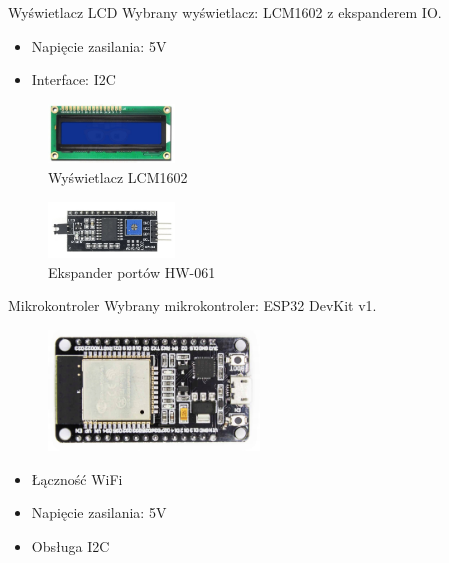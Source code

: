 \documentclass[11pt]{beamer}
\begin{document}
\begin{frame}{Wyświetlacz LCD}
        Wybrany wyświetlacz: LCM1602 z ekspanderem IO.
        \begin{itemize}
            \item Napięcie zasilania: 5V
            \item Interface: I2C
        \end{itemize}

        \begin{figure}
            \includegraphics[width=0.3\textwidth]{images/LCM1602}
            \caption{Wyświetlacz LCM1602}
        \end{figure}

        \begin{figure}
            \includegraphics[width=0.3\textwidth]{images/HW-061}
            \caption{Ekspander portów HW-061}
        \end{figure}

\end{frame}

\begin{frame}{Mikrokontroler}
    Wybrany mikrokontroler: ESP32 DevKit v1.
    \begin{figure}
        \includegraphics[width=0.5\textwidth]{images/ESP32}
    \end{figure}
    
    \begin{itemize}
        \item Łączność WiFi
        \item Napięcie zasilania: 5V
        \item Obsługa I2C
    \end{itemize}
\end{frame}
\end{document}
